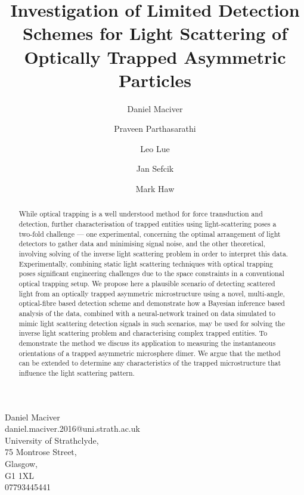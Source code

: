 \documentclass[final,  3p]{elsarticle}
\begin{document}
\begin{frontmatter}

\title{Investigation of Limited Detection Schemes for Light Scattering of Optically Trapped Asymmetric Particles}


\author[aff1]{Daniel Maciver} 

\author[aff1]{Praveen Parthasarathi}

\author[aff1]{Leo Lue}

\author[aff1]{Jan Sefcik}

\author[aff1]{Mark Haw}

        
\begin{flushright}
	Daniel Maciver \\
	daniel.maciver.2016@uni.strath.ac.uk \\
	University of Strathclyde, \\
	75 Montrose Street, \\
	Glasgow, \\
	G1 1XL \\
	07793445441 
\end{flushright}

\begin{abstract}
  While optical trapping is a well understood method for force
  transduction and detection, further characterisation of trapped entities using light-scattering
  poses a two-fold challenge --- one experimental, concerning the optimal
  arrangement of light detectors to gather data and minimising signal noise, and the other theoretical, involving
  solving of the inverse light scattering problem in order to interpret this data. Experimentally, combining static
  light scattering techniques with optical trapping poses significant
  engineering challenges due to the space constraints in a
  conventional optical trapping setup.  We propose here a plausible
  scenario of detecting scattered light from an optically trapped
  asymmetric microstructure using a novel, multi-angle, optical-fibre
  based detection scheme and demonstrate how a Bayesian inference
  based analysis of the data, combined with a neural-network trained on data simulated to mimic light scattering
  detection signals in such scenarios, may be used for solving the
  inverse light scattering problem and characterising complex trapped
  entities.  To demonstrate the method we discuss its application to
  measuring the instantaneous orientations of a trapped asymmetric microsphere
  dimer. We argue that the method can be extended to
  determine any characteristics of the trapped microstructure that
  influence the light scattering pattern.
\end{abstract}
	

\end{frontmatter}
\end{document}

